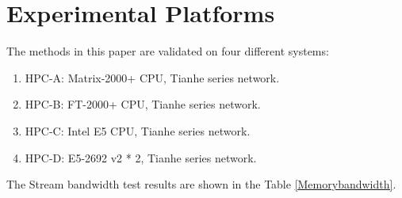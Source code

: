 \section {Experimental Platforms}
The methods in this paper are validated on four different systems:
\begin{enumerate}[(1)]
\item HPC-A: Matrix-2000+ CPU, Tianhe series network.
\item HPC-B: FT-2000+ CPU, Tianhe series network.
\item HPC-C: Intel E5 CPU, Tianhe series network. 
\item HPC-D: E5-2692 v2 * 2, Tianhe series network. 
\end{enumerate}
The Stream bandwidth test results are shown in the Table \ref{Memorybandwidth}.

